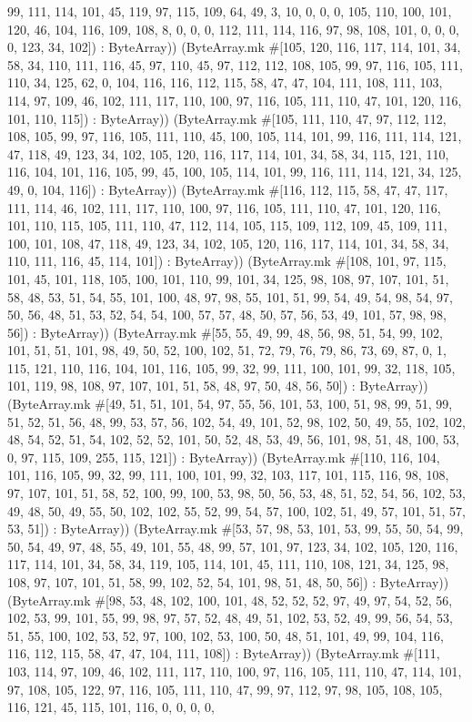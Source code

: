 \documentclass[11pt]{article}
\begin{document}
99, 111, 114, 101, 45, 119, 97, 115, 109, 64, 49, 3, 10, 0, 0, 0, 105, 110, 100, 101, 120, 46, 104, 116, 109, 108, 8, 0, 0, 0, 112, 111, 114, 116, 97, 98, 108, 101, 0, 0, 0, 0, 123, 34, 102]) : ByteArray)) (ByteArray.mk \#[105, 120, 116, 117, 114, 101, 34, 58, 34, 110, 111, 116, 45, 97, 110, 45, 97, 112, 112, 108, 105, 99, 97, 116, 105, 111, 110, 34, 125, 62, 0, 104, 116, 116, 112, 115, 58, 47, 47, 104, 111, 108, 111, 103, 114, 97, 109, 46, 102, 111, 117, 110, 100, 97, 116, 105, 111, 110, 47, 101, 120, 116, 101, 110, 115]) : ByteArray)) (ByteArray.mk \#[105, 111, 110, 47, 97, 112, 112, 108, 105, 99, 97, 116, 105, 111, 110, 45, 100, 105, 114, 101, 99, 116, 111, 114, 121, 47, 118, 49, 123, 34, 102, 105, 120, 116, 117, 114, 101, 34, 58, 34, 115, 121, 110, 116, 104, 101, 116, 105, 99, 45, 100, 105, 114, 101, 99, 116, 111, 114, 121, 34, 125, 49, 0, 104, 116]) : ByteArray)) (ByteArray.mk \#[116, 112, 115, 58, 47, 47, 117, 111, 114, 46, 102, 111, 117, 110, 100, 97, 116, 105, 111, 110, 47, 101, 120, 116, 101, 110, 115, 105, 111, 110, 47, 112, 114, 105, 115, 109, 112, 109, 45, 109, 111, 100, 101, 108, 47, 118, 49, 123, 34, 102, 105, 120, 116, 117, 114, 101, 34, 58, 34, 110, 111, 116, 45, 114, 101]) : ByteArray)) (ByteArray.mk \#[108, 101, 97, 115, 101, 45, 101, 118, 105, 100, 101, 110, 99, 101, 34, 125, 98, 108, 97, 107, 101, 51, 58, 48, 53, 51, 54, 55, 101, 100, 48, 97, 98, 55, 101, 51, 99, 54, 49, 54, 98, 54, 97, 50, 56, 48, 51, 53, 52, 54, 54, 100, 57, 57, 48, 50, 57, 56, 53, 49, 101, 57, 98, 98, 56]) : ByteArray)) (ByteArray.mk \#[55, 55, 49, 99, 48, 56, 98, 51, 54, 99, 102, 101, 51, 51, 101, 98, 49, 50, 52, 100, 102, 51, 72, 79, 76, 79, 86, 73, 69, 87, 0, 1, 115, 121, 110, 116, 104, 101, 116, 105, 99, 32, 99, 111, 100, 101, 99, 32, 118, 105, 101, 119, 98, 108, 97, 107, 101, 51, 58, 48, 97, 50, 48, 56, 50]) : ByteArray)) (ByteArray.mk \#[49, 51, 51, 101, 54, 97, 55, 56, 101, 53, 100, 51, 98, 99, 51, 99, 51, 52, 51, 56, 48, 99, 53, 57, 56, 102, 54, 49, 101, 52, 98, 102, 50, 49, 55, 102, 102, 48, 54, 52, 51, 54, 102, 52, 52, 101, 50, 52, 48, 53, 49, 56, 101, 98, 51, 48, 100, 53, 0, 97, 115, 109, 255, 115, 121]) : ByteArray)) (ByteArray.mk \#[110, 116, 104, 101, 116, 105, 99, 32, 99, 111, 100, 101, 99, 32, 103, 117, 101, 115, 116, 98, 108, 97, 107, 101, 51, 58, 52, 100, 99, 100, 53, 98, 50, 56, 53, 48, 51, 52, 54, 56, 102, 53, 49, 48, 50, 49, 55, 50, 102, 102, 55, 52, 99, 54, 57, 100, 102, 51, 49, 57, 101, 51, 57, 53, 51]) : ByteArray)) (ByteArray.mk \#[53, 57, 98, 53, 101, 53, 99, 55, 50, 54, 99, 50, 54, 49, 97, 48, 55, 49, 101, 55, 48, 99, 57, 101, 97, 123, 34, 102, 105, 120, 116, 117, 114, 101, 34, 58, 34, 119, 105, 114, 101, 45, 111, 110, 108, 121, 34, 125, 98, 108, 97, 107, 101, 51, 58, 99, 102, 52, 54, 101, 98, 51, 48, 50, 56]) : ByteArray)) (ByteArray.mk \#[98, 53, 48, 102, 100, 101, 48, 52, 52, 52, 97, 49, 97, 54, 52, 56, 102, 53, 99, 101, 55, 99, 98, 97, 57, 52, 48, 49, 51, 102, 53, 52, 49, 99, 56, 54, 53, 51, 55, 100, 102, 53, 52, 97, 100, 102, 53, 100, 50, 48, 51, 101, 49, 99, 104, 116, 116, 112, 115, 58, 47, 47, 104, 111, 108]) : ByteArray)) (ByteArray.mk \#[111, 103, 114, 97, 109, 46, 102, 111, 117, 110, 100, 97, 116, 105, 111, 110, 47, 114, 101, 97, 108, 105, 122, 97, 116, 105, 111, 110, 47, 99, 97, 112, 97, 98, 105, 108, 105, 116, 121, 45, 115, 101, 116, 0, 0, 0, 0, 
\end{document}
